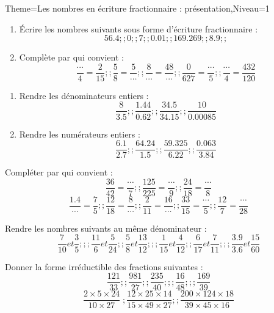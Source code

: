 \documentclass[a4paper,12pt]{article}
\begin{document}
\begin{Maquette}[Fiche]{Theme=Les nombres en écriture fractionnaire : présentation,Niveau=1}

\begin{exercice}
\begin{enumerate}
\item \'Ecrire les nombres suivants sous forme d'écriture fractionnaire :
$$56.4 ;; 0 ;; 7 ;; 0.01 ;; 169.269 ;; 8.9 ;;  $$

\item Complète par qui convient :
$$\dfrac{\cdots}{4}=\dfrac{2}{15} ;; \dfrac{5}{8}=\dfrac{5}{\cdots} ;; \dfrac{8}{\cdots}=\dfrac{48}{\cdots} ;; \dfrac{0}{627}=\dfrac{\cdots}{5} ;; \dfrac{\cdots}{4}=\dfrac{432}{120}$$
\end{enumerate}
\end{exercice}

\begin{exercice}
\begin{enumerate}
\item Rendre les dénominateurs entiers :
$$\dfrac{8}{3.5} ;; \dfrac{1.44}{0.62} ;; \dfrac{34.5}{34.15} ;; \dfrac{10}{0.00085} $$

\item Rendre les numérateurs entiers :
$$\dfrac{6.1}{2.7} ;; \dfrac{64.24}{1.5} ;; \dfrac{59.325}{6.22} ;; \dfrac{0.063}{3.84} $$
\end{enumerate}
\end{exercice}

\begin{exercice}
Compléter par qui convient :
$$\dfrac{36}{42}=\dfrac{\cdots}{7} ;; \dfrac{125}{225}=\dfrac{\cdots}{9} ;; \dfrac{24}{18}=\dfrac{\cdots}{8}$$
$$\dfrac{1.4}{\cdots}=\dfrac{7}{5} ;; \dfrac{12}{18}=\dfrac{8}{\cdots} ;; \dfrac{2}{11}=\dfrac{16}{\cdots} ;; \dfrac{33}{15}=\dfrac{\cdots}{5} ;; \dfrac{12}{7}=\dfrac{\cdots}{28} $$
\end{exercice}

\begin{exercice}
Rendre les nombres suivants au même dénominateur :
$$\dfrac{7}{10}et \dfrac{3}{5};;;\dfrac{11}{6}et\dfrac{5}{24};;\dfrac{5}{8}et\dfrac{13}{12};;;\dfrac{1}{15}et\dfrac{4}{12};;\dfrac{6}{17}et\dfrac{7}{11};;;\dfrac{3.9}{3.6}et\dfrac{15}{60} $$
\end{exercice}

\begin{exercice}
Donner la forme irréductible des fractions suivantes :
$$\dfrac{121}{33};;\dfrac{981}{27};;\dfrac{235}{40};;;\dfrac{16}{48};;;\dfrac{169}{39} $$
$$\dfrac{2\times 5\times 24}{10\times 27}\;; \dfrac{12\times 25\times 14}{15\times 49\times 27} ;; \dfrac{200\times 124 \times 18}{39\times 45 \times 16} $$


\end{exercice}
\end{Maquette}
\end{document}

